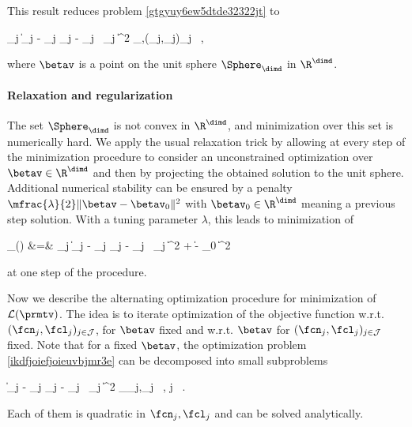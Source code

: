 This result reduces problem \eqref{gtgyuy6ew5dtde32322jt} to
\begin{EQA}[c]
	\sum_{j \in \JJJ} \bigl\| \Imav_{j} - \fcn_{j} \Sv_{j} - \fcl_{j} \, \UV_{j} \betav \bigr\|^{2}
	\to
	\inf_{\betav,(\fcn_{j},\fcl_{j})_{j \in \JJJ}}
	\, ,
\label{ikdfjoiefjoieuvbjmr3e}
\end{EQA}
where \( \betav \) is a point on the unit sphere \( \Sphere_{\dimd} \) in \( \R^{\dimd} \).

\paragraph{Relaxation and regularization}
The set \( \Sphere_{\dimd} \) is not convex in \( \R^{\dimd} \), 
and minimization over this set is numerically hard.
We apply the usual relaxation trick by allowing at every step of the minimization procedure 
to consider an unconstrained optimization over \( \betav \in \R^{\dimd} \) and then by projecting 
the obtained solution to the unit sphere.
Additional numerical stability can be ensured 
by a penalty \( \mfrac{\lambda}{2} \| \betav - \betav_{0} \|^{2} \) with \( \betav_{0} \in \R^{\dimd} \)
meaning a previous step solution.
With a tuning parameter \( \lambda \), this leads to minimization of
\begin{EQA}
	\LL_{\lambda}(\prmtv)
	&=&
	 \sum_{j \in \JJJ} \bigl\| \Imav_{j} - \fcn_{j} \Sv_{j} - \fcl_{j} \, \UV_{j} \betav \bigr\|^{2} 
	+  \| \betav - \betav_{0} \|^{2} 
	\, 
\label{tjjc7c6f5fd5e5erjwyhfd}
\end{EQA}
at one step of the procedure.
%

\label{SLLaltern}
Now we describe the alternating optimization procedure for minimization of \( \LL(\prmtv) \).
The idea is to iterate optimization of the objective function w.r.t. \( (\fcn_{j},\fcl_{j})_{j \in \JJJ} \),
for \( \betav \) fixed
and w.r.t. \( \betav \) for \( (\fcn_{j},\fcl_{j})_{j \in \JJJ} \) fixed.
Note that for a fixed \( \betav \), the optimization problem \eqref{ikdfjoiefjoieuvbjmr3e}
can be decomposed into small subproblems 
\begin{EQA}[c]
	\bigl\| \Imav_{j} - \fcn_{j} \Sv_{j} - \fcl_{j} \, \UV_{j} \betav \bigr\|^{2}
	\to \inf_{\fcn_{j},\fcl_{j}}
	\, ,
	\qquad
	j \in \JJJ
	\, .
\end{EQA}
Each of them is quadratic in \( \fcn_{j},\fcl_{j} \) and can be solved analytically.

